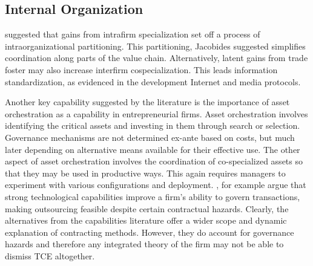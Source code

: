 \documentclass[12pt,letterpaper]{article}
\begin{document}
\subsection{Internal Organization}
\cite{Jacobides2005b} suggested that gains from intrafirm specialization set off a process of intraorganizational partitioning. This partitioning, Jacobides suggested simplifies coordination along parts of the value chain. Alternatively, latent gains from trade foster may also increase interfirm cospecialization. This leads information standardization, as evidenced in the development Internet and media protocols. \par
Another key capability suggested by the literature is the importance of asset orchestration as a capability in entrepreneurial firms. Asset orchestration involves identifying the critical assets and investing in them through search or selection. Governance mechanisms are not determined ex-ante based on costs, but much later depending on alternative means available for their effective use. The other aspect of asset orchestration involves the coordination of co-specialized assets so that they may be used in productive ways. This again requires managers to experiment with various configurations and deployment. \cite{Mayer2006}, for example argue that strong technological capabilities improve a firm's ability to govern transactions, making outsourcing feasible despite certain contractual hazards. Clearly, the alternatives from the capabilities literature offer a wider scope and dynamic explanation of contracting methods. However, they do account for governance hazards and therefore any integrated theory of the firm may not be able to dismiss TCE altogether.
\end{document}
